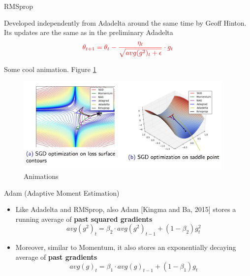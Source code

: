 \documentclass[english]{article}
\begin{document}

\item {RMSprop}

Developed independently from Adadelta around the same time by Geoff Hinton. Its updates are the same as in the preliminary Adadelta
 $$\textcolor{red}{\theta_{t+1} = \theta_t - \frac{\eta_t}{\sqrt{avg(g^2)_t + \epsilon}} \cdot g_t}$$







\item {Some cool animation}. Figure \ref{animations}

\begin{figure}
 \centering
\includegraphics[width = 0.95\textwidth]{animations.png}
\caption{Animations}
\label{animations}
\end{figure}



\href{https://imgur.com/a/Hqolp}{}









\item {Adam (Adaptive Moment Estimation)}



\begin{itemize}
\item Like Adadelta and RMSprop, also Adam [Kingma and Ba, 2015] stores a running average of \textbf{past squared gradients}
$$avg(g^2)_t = \beta_2 \cdot avg(g^2)_{t-1} + (1-\beta_2) g^2_t$$

\item Moreover, similar to Momentum, it also stores an exponentially decaying average of \textbf{past gradients}
$$avg(g)_t = \beta_1 \cdot avg(g)_{t-1} + (1-\beta_1) g_t$$
\end{itemize}
\end{document}
